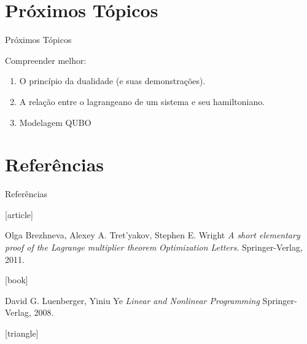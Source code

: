 \documentclass[brazil, MathSerif, aspectratio = 169]{beamer}
\begin{document}
\section{Próximos Tópicos}
\begin{frame}{Próximos Tópicos}

    Compreender melhor:
    \begin{enumerate}%
        \item O princípio da dualidade (e suas demonstrações).

        \item A relação entre o lagrangeano de um sistema e seu hamiltoniano.
        
        \item Modelagem QUBO
    \end{enumerate}
\end{frame}

\section{Referências}
\begin{frame}%
    {Referências}

    \begin{thebibliography}{}

        [article]

        Olga Brezhneva, Alexey A. Tret’yakov, Stephen E. Wright
        \newblock \emph{A short elementary proof of the Lagrange multiplier theorem}
        \newblock \emph{Optimization Letters}.
        \newblock Springer-Verlag, 2011.

        [book]

        David G. Luenberger, Yiniu Ye
        \newblock \emph{Linear and Nonlinear Programming}
        \newblock Springer-Verlag, 2008.

        [triangle]

    \end{thebibliography}
\end{frame}
\end{document}
